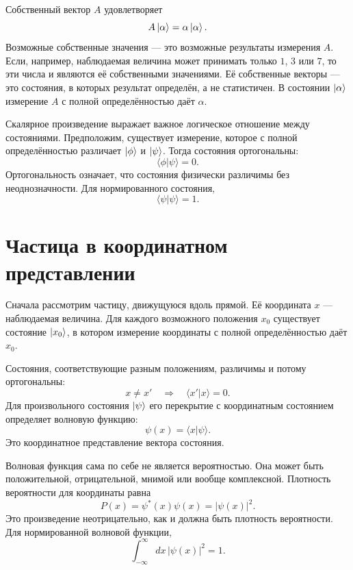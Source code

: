 Собственный вектор \(A\) удовлетворяет
\begin{equation}
A\left\lvert\alpha\right\rangle=\alpha\left\lvert\alpha\right\rangle.
\end{equation}
Возможные собственные значения — это возможные результаты измерения \(A\). Если, например, наблюдаемая величина может принимать только \(1\), \(3\) или \(7\), то эти числа и являются её собственными значениями. Её собственные векторы — это состояния, в которых результат определён, а не статистичен. В состоянии \(\left\lvert\alpha\right\rangle\) измерение \(A\) с полной определённостью даёт \(\alpha\).

Скалярное произведение выражает важное логическое отношение между состояниями. Предположим, существует измерение, которое с полной определённостью различает \(\left\lvert\phi\right\rangle\) и \(\left\lvert\psi\right\rangle\). Тогда состояния ортогональны:
\begin{equation}
\langle\phi|\psi\rangle=0.
\end{equation}
Ортогональность означает, что состояния физически различимы без неоднозначности. Для нормированного состояния,
\begin{equation}
\langle\psi|\psi\rangle=1.
\end{equation}

\section{Частица в координатном представлении}

Сначала рассмотрим частицу, движущуюся вдоль прямой. Её координата \(x\) — наблюдаемая величина. Для каждого возможного положения \(x_0\) существует состояние \(\left\lvert x_0\right\rangle\), в котором измерение координаты с полной определённостью даёт \(x_0\).

Состояния, соответствующие разным положениям, различимы и потому ортогональны:
\begin{equation}
x\neq x'
\quad\Longrightarrow\quad
\langle x'|x\rangle=0.
\end{equation}
Для произвольного состояния \(\left\lvert\psi\right\rangle\) его перекрытие с координатным состоянием определяет волновую функцию:
\begin{equation}
\psi(x)=\langle x|\psi\rangle.
\end{equation}
Это координатное представление вектора состояния.

Волновая функция сама по себе не является вероятностью. Она может быть положительной, отрицательной, мнимой или вообще комплексной. Плотность вероятности для координаты равна
\begin{equation}
P(x)=\psi^*(x)\psi(x)=|\psi(x)|^2.
\end{equation}
Это произведение неотрицательно, как и должна быть плотность вероятности. Для нормированной волновой функции,
\begin{equation}
\int_{-\infty}^{\infty}dx\,|\psi(x)|^2=1.
\end{equation}

